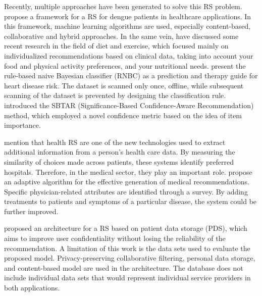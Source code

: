 \documentclass[sustainability,article,submit,pdftex,moreauthors]{Definitions/mdpi}
\begin{document}
Recently, multiple approaches have been generated to solve this RS problem. \citet{shaikh2022recommender} propose a framework for a RS for dengue patients in healthcare applications. In this framework, machine learning algorithms are used, especially content-based, collaborative and hybrid approaches. In the same vein, \citet{vairale2019recommendation} have discussed some recent research in the field of diet and exercise, which focused mainly on individualized recommendations based on clinical data, taking into account your food and physical activity preferences, and your nutritional needs. \citet{fasidi2019rule} present the rule-based naive Bayesian classifier (RNBC) as a prediction and therapy guide for heart disease risk. The dataset is scanned only once, offline, while subsequent scanning of the dataset is prevented by designing the classification rule. \citet{gohari2020significance} introduced the SBTAR (Significance-Based Confidence-Aware Recommendation) method, which employed a novel confidence metric based on the idea of item importance.

\citet{sahoo2019intelligence} mention that health RS are one of the new technologies used to extract additional information from a person's health care data. By measuring the similarity of choices made across patients, these systems identify preferred hospitals. Therefore, in the medical sector, they play an important role. \citet{waqar2019adaptive} propose an adaptive algorithm for the effective generation of medical recommendations. Specific physician-related attributes are identified through a survey. By adding treatments to patients and symptoms of a particular disease, the system could be further improved.

\citet{mazeh2020personal} proposed an architecture for a RS based on patient data storage (PDS), which aims to improve user confidentiality without losing the reliability of the recommendation. A limitation of this work is the data sets used to evaluate the proposed model. Privacy-preserving collaborative filtering, personal data storage, and content-based model are used in the architecture. The database does not include individual data sets that would represent individual service providers in both applications.
\end{document}
